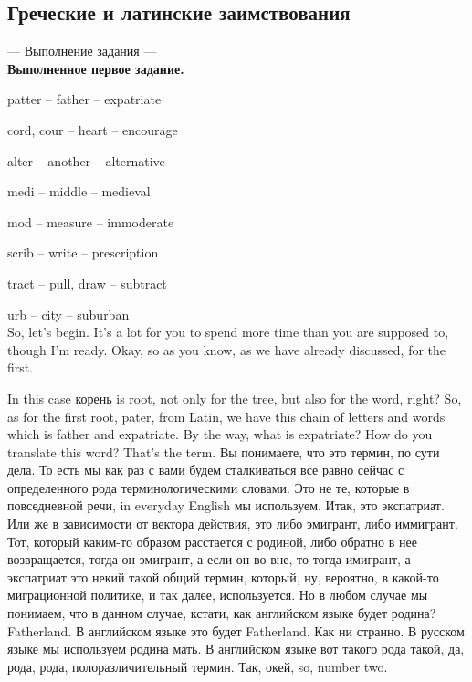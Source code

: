 \documentclass[main.tex]{subfiles}
\begin{document}
\subsection{Греческие и латинские заимствования}

--- Выполнение задания ---
\\

\textbf{Выполненное первое задание.}

patter -- father -- expatriate

cord, cour -- heart -- encourage

alter -- another -- alternative

medi -- middle -- medieval

mod -- measure -- immoderate

scrib -- write -- prescription

tract -- pull, draw -- subtract

urb -- city -- suburban
\\

So, let's begin.
It's a lot for you to spend more time than you are supposed to, though I'm ready.
Okay, so as you know, as we have already discussed, for the first.

In this case корень is root, not only for the tree, but also for the word, right?
So, as for the first root, pater, from Latin, we have this chain of letters and words which is father and expatriate.
By the way, what is expatriate? How do you translate this word? That's the term.
Вы понимаете, что это термин, по сути дела.
То есть мы как раз с вами будем сталкиваться все равно сейчас с определенного рода терминологическими словами.
Это не те, которые в повседневной речи, in everyday English мы используем.
Итак, это экспатриат.
Или же в зависимости от вектора действия, это либо эмигрант, либо иммигрант.
Тот, который каким-то образом расстается с родиной, либо обратно в нее возвращается, тогда он эмигрант, а если он во вне, то тогда имигрант, а экспатриат это некий такой общий термин, который, ну, вероятно, в какой-то миграционной политике, и так далее, используется.
Но в любом случае мы понимаем, что в данном случае, кстати, как английском языке будет родина? Fatherland.
В английском языке это будет Fatherland.
Как ни странно.
В русском языке мы используем родина мать.
В английском языке вот такого рода такой, да, рода, рода, полоразличительный термин.
Так, окей, so, number two.
\end{document}
